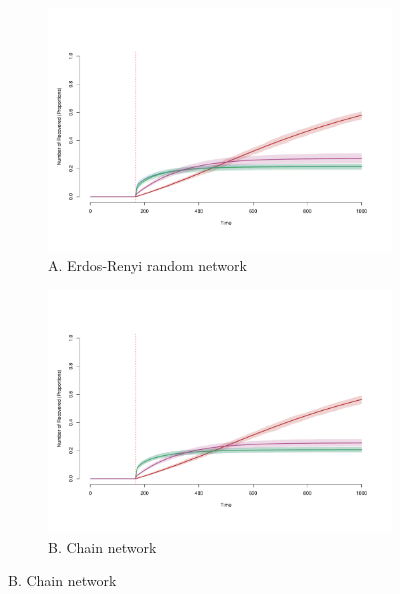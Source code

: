 \documentclass[man, 12pt, a4paper, nolmodern, noextraspace]{apa6}
\begin{document}
\begin{figure}
\captionsetup[subfigure]{labelfont=bf,textfont=normalfont,singlelinecheck=on}
    \centering
    \begin{subfigure}[t]{0.49\textwidth}
        \centering
        \includegraphics[trim={1.5cm 2.7cm 2cm 5cm}, clip, width=\linewidth]{draft/Fig3a.pdf} 
        \caption*{A. Erdos-Renyi random network}
        \label{fig3:random}
    \end{subfigure}
    \hfill
    \begin{subfigure}[t]{0.49\textwidth}
        \centering
        \includegraphics[trim={1.5cm 2.7cm 2cm 5cm}, clip, width=\linewidth]{draft/Fig3b.pdf} 
        \caption*{B. Chain network} \label{fig3:chain}
    \end{subfigure}


\end{figure}
\end{document}
